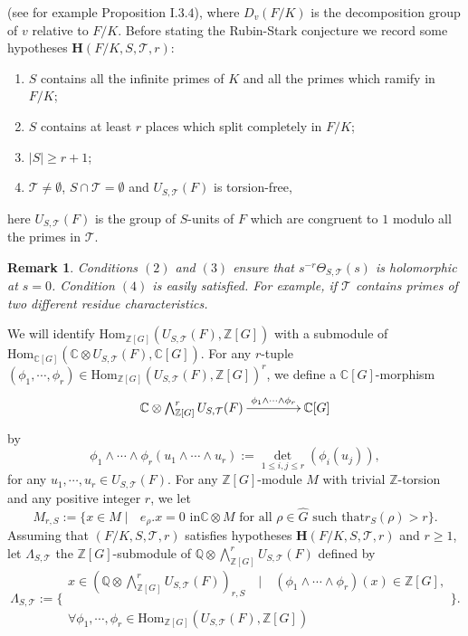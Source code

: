 \documentclass[reqno]{amsart}
\newcounter{dummy} \numberwithin{dummy}{section}
\newtheorem{rem}[dummy]{Remark}
\begin{document}
(see for example \cite{Tate84} Proposition $\textrm{I}.3.4$), where
$D_{v}(F/K)$ is the decomposition group of $v$ relative to
$F/K$.\vskip 6pt
 Before stating the Rubin-Stark conjecture we record some hypotheses
 $\mathbf{H}(F/K,S,\mathcal{T},r)$:
\begin{enumerate}
    \item $S$ contains all the infinite primes of $K$ and all the
    primes which ramify in $F/K$;
    \item $S$ contains at least $r$ places which split completely in
    $F/K$;
    \item $|S|\geq r+1$;
    \item $\mathcal{T}\neq \emptyset$, $S\cap \mathcal{T}=\emptyset$ and $U_{S,\mathcal{T}}(F)$ is
    torsion-free,
\end{enumerate}
here $U_{S,\mathcal{T}}(F)$ is the group of $S$-units of $F$ which
are congruent to $1$ modulo all the primes in $\mathcal{T}$.
\begin{rem}
Conditions $(2)$ and $(3)$ ensure that
$s^{-r}\Theta_{S,\mathcal{T}}(s)$ is holomorphic at $s=0$. Condition
$(4)$ is easily satisfied. For example, if $\mathcal{T}$ contains
primes of two different residue characteristics.
\end{rem}
We will identify
$\mathrm{Hom}_{\mathbb{Z}[G]}(U_{S,\mathcal{T}}(F),\mathbb{Z}[G])$
with a submodule of $\mathrm{Hom}_{\mathbb{C}[G]}(\mathbb{C}\otimes
U_{S,\mathcal{T}}(F), \mathbb{C}[G])$. For any  $r$-tuple
$(\phi_{1},\cdots,\phi_{r})\in\mathrm{Hom}_{\mathbb{Z}[G]}(U_{S,\mathcal{T}}(F),\mathbb{Z}[G])^{r}$,
we define a $\mathbb{C}[G]$-morphism
$$
\xymatrix@=3.5pc{
\mathbb{C}\otimes\bigwedge^{r}_{\mathbb{Z}[G]}U_{S,\mathcal{T}}(F)
\ar[r]^-{\phi_{1}\wedge\cdots\wedge \phi_{r}}& \mathbb{C}[G]}
$$
by
$$
\phi_{1}\wedge\cdots\wedge \phi_{r}(u_{1}\wedge\cdots\wedge
u_{r}):=\displaystyle{\det_{1\leq i,j\leq r}}(\phi_{i}(u_{j})),
$$
for any $u_{1},\cdots, u_{r}\in U_{S,\mathcal{T}}(F)$.\vskip 6pt
 For any $\mathbb{Z}[G]$-module $M$ with trivial
$\mathbb{Z}$-torsion and any positive integer $r$, we let
$$
M_{r,S}:=\big\{ x\in M\;|\;\mbox{ $e_{\rho}.x=0$ in
$\mathbb{C}\otimes M$ for all $\rho\in \widehat{G}$ such that
$r_{S}(\rho)> r$}\big\}.
$$
Assuming that $(F/K,S,\mathcal{T},r)$ satisfies hypotheses
$\mathbf{H}(F/K,S,\mathcal{T},r)$ and $r\geq 1$, let
$\Lambda_{S,\mathcal{T}}$ the $\mathbb{Z}[G]$-submodule of
$\mathbb{Q}\otimes\bigwedge^{r}_{\mathbb{Z}[G]}U_{S,\mathcal{T}}(F)$
defined by
 $$ \Lambda_{S,\mathcal{T}}:={\bigg\{\substack{ x\in
(\mathbb{Q}\otimes\bigwedge^{r}_{\mathbb{Z}[G]}U_{S,\mathcal{T}}(F))_{r,S}\quad|\quad
(\phi_{1}\wedge\cdots\wedge \phi_{r})(x)\in \mathbb{Z}[G],\\  \\
\forall
\phi_{1},\cdots,\phi_{r}\in\mathrm{Hom}_{\mathbb{Z}[G]}(U_{S,\mathcal{T}}(F),\mathbb{Z}[G])
}\bigg\}} .$$
\end{document}
